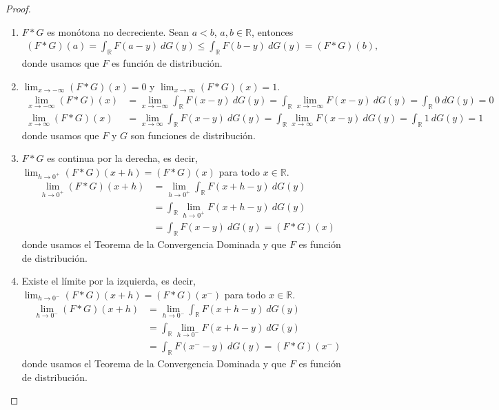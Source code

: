 \begin{proof}
    \begin{enumerate}
    \item $F*G$ es monótona no decreciente. Sean $a < b$, $a,b \in \mathbb{R}$, entonces
    \begin{align*}
        (F*G)(a) = \int_{\mathbb{R}} F(a-y) \ dG(y) \leq \int_{\mathbb{R}} F(b-y) \ dG(y) = (F*G)(b),
    \end{align*}
    donde usamos que $F$ es función de distribución.
    \item $\lim_{x \to - \infty}(F*G)(x) = 0$ y $\lim_{x \to \infty}(F*G)(x) = 1$.
    \begin{align*}
        \lim_{x \to -\infty} (F*G)(x) &= \lim_{x \to -\infty} \int_{\mathbb{R}} F(x-y) \ dG(y)  = \int_{\mathbb{R}} \lim_{x \to -\infty} F(x-y) \ dG(y) 
        = \int_{\mathbb{R}} 0 \ dG(y) = 0 \\
        \lim_{x \to \infty} (F*G)(x) &= \lim_{x \to \infty} \int_{\mathbb{R}} F(x-y) \ dG(y)  = \int_{\mathbb{R}} \lim_{x \to \infty} F(x-y) \ dG(y) 
        = \int_{\mathbb{R}} 1 \ dG(y) = 1
    \end{align*}
    donde usamos que $F$ y $G$ son funciones de distribución.
    \item $F*G$ es continua por la derecha, es decir, $\lim_{h \to 0^+}(F*G)(x+h) = (F*G)(x)$ para todo $x \in \mathbb{R}$.
        \begin{align*}
        \lim_{h \to 0^+} (F*G)(x+h) &= \lim_{h \to 0^+} \int_{\mathbb{R}} F(x+h-y) \ dG(y) \\
        &= \int_{\mathbb{R}} \lim_{h \to 0^+} F(x+h-y) \ dG(y) \\
        &= \int_{\mathbb{R}} F(x-y) \ dG(y) = (F*G)(x)
    \end{align*}
    donde usamos el Teorema de la Convergencia Dominada y que $F$ es función de distribución.
    \item Existe el límite por la izquierda, es decir, $\lim_{h \to 0^-}(F*G)(x+h) = (F*G)(x^-)$ para todo $x \in \mathbb{R}$.
    \begin{align*}
        \lim_{h \to 0^-} (F*G)(x+h) &= \lim_{h \to 0^-} \int_{\mathbb{R}} F(x+h-y) \ dG(y) \\
        &= \int_{\mathbb{R}} \lim_{h \to 0^-} F(x+h-y) \ dG(y) \\
        &= \int_{\mathbb{R}} F(x^--y) \ dG(y) = (F*G)(x^-)
    \end{align*}
    donde usamos el Teorema de la Convergencia Dominada y que $F$ es función de distribución.
\end{enumerate}
\end{proof}


